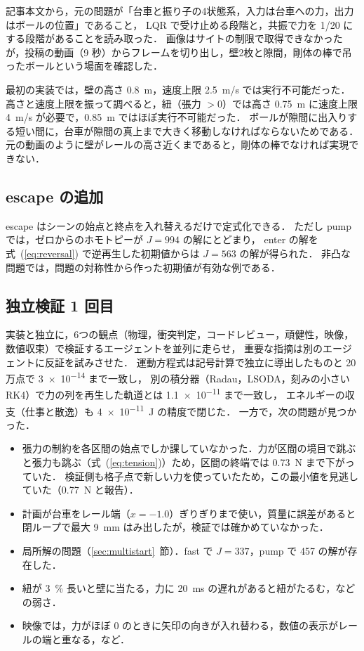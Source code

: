 \documentclass[a4paper,10pt]{ltjsarticle}
\newcommand{\secref}[1]{\ref{#1}~節}
\newcommand{\eqnref}[1]{式~(\ref{#1})}
\begin{document}
記事本文から，元の問題が「台車と振り子の4状態系，入力は台車への力，出力はボールの位置」であること，
LQR で受け止める段階と，共振で力を 1/20 にする段階があることを読み取った．
画像はサイトの制限で取得できなかったが，投稿の動画（9 秒）からフレームを切り出し，壁2枚と隙間，剛体の棒で吊ったボールという場面を確認した．

最初の実装では，壁の高さ \SI{0.8}{m}，速度上限 \SI{2.5}{m/s} では実行不可能だった．
高さと速度上限を振って調べると，紐（張力 $>0$）では高さ \SI{0.75}{m} に速度上限 \SI{4}{m/s} が必要で，\SI{0.85}{m} ではほぼ実行不可能だった．
ボールが隙間に出入りする短い間に，台車が隙間の真上まで大きく移動しなければならないためである．
元の動画のように壁がレールの高さ近くまであると，剛体の棒でなければ実現できない．

\subsection{escape の追加}

escape はシーンの始点と終点を入れ替えるだけで定式化できる．
ただし pump では，ゼロからのホモトピーが $J=994$ の解にとどまり，
enter の解を \eqnref{eq:reversal} で逆再生した初期値からは $J=563$ の解が得られた．
非凸な問題では，問題の対称性から作った初期値が有効な例である．

\subsection{独立検証 1 回目}

実装と独立に，6つの観点（物理，衝突判定，コードレビュー，頑健性，映像，数値収束）で検証するエージェントを並列に走らせ，
重要な指摘は別のエージェントに反証を試みさせた．
運動方程式は記号計算で独立に導出したものと 20 万点で \num{3e-14} まで一致し，
別の積分器（Radau，LSODA，刻みの小さい RK4）で力の列を再生した軌道とは \num{1.1e-11} まで一致し，
エネルギーの収支（仕事と散逸）も \SI{4e-11}{J} の精度で閉じた．
一方で，次の問題が見つかった．
\begin{itemize}
  \item 張力の制約を各区間の始点でしか課していなかった．力が区間の境目で跳ぶと張力も跳ぶ（\eqnref{eq:tension}）ため，区間の終端では \SI{0.73}{N} まで下がっていた．
        検証側も格子点で新しい力を使っていたため，この最小値を見逃していた（\SI{0.77}{N} と報告）．
  \item 計画が台車をレール端（$x=-1.0$）ぎりぎりまで使い，質量に誤差があると閉ループで最大 \SI{9}{mm} はみ出したが，検証では確かめていなかった．
  \item 局所解の問題（\secref{sec:multistart}）．fast で $J=337$，pump で 457 の解が存在した．
  \item 紐が \SI{3}{\%} 長いと壁に当たる，力に \SI{20}{ms} の遅れがあると紐がたるむ，などの弱さ．
  \item 映像では，力がほぼ 0 のときに矢印の向きが入れ替わる，数値の表示がレールの端と重なる，など．
\end{itemize}
\end{document}

